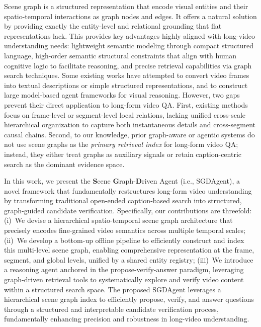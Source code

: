 \documentclass[sigconf, screen, review, anonymous]{acmart}
\begin{document}
Scene graph is a structured representation that encode visual entities and their spatio-temporal interactions as graph nodes and edges\cite{scenegraph1,tpt2023}. It offers a natural solution by providing exactly the entity-level and relational grounding that flat representations lack. This provides key advantages highly aligned with long-video understanding needs: lightweight semantic modeling through compact structured language, high-order semantic structural constraints that align with human cognitive logic to facilitate reasoning, and precise retrieval capabilities via graph search techniques\cite{scenegraph1,scenegraph2,qiu2025step}. 
Some existing works\cite{fei2024videoofthought, videoagent, omagent2024, vagent2025, deepvideo2025, drvideo2025} have attempted to convert video frames into textual descriptions or simple structured representations, and to construct large model-based agent frameworks for visual reasoning.
However, two gaps prevent their direct application to long-form video QA\@. First, existing methods focus on frame-level or segment-level local relations, lacking unified cross-scale hierarchical organization to capture both instantaneous details and cross-segment causal chains\cite{tpt2023,vagent2025}. Second, to our knowledge, prior graph-aware or agentic systems do not use scene graphs as the \emph{primary retrieval index} for long-form video QA; instead, they either treat graphs as auxiliary signals or retain caption-centric search as the dominant evidence space\cite{vagent2025,videoagent,deepvideo2025}.


In this work, we present the \textbf{S}cene \textbf{G}raph-\textbf{D}riven Agent (i.e., SGDAgent), a novel framework that fundamentally restructures long-form video understanding by transforming traditional open-ended caption-based search into structured, graph-guided candidate verification. Specifically, our contributions are threefold: (i)~We devise a hierarchical spatio-temporal scene graph architecture that precisely encodes fine-grained video semantics across multiple temporal scales; (ii)~We develop a bottom-up offline pipeline to efficiently construct and index this multi-level scene graph, enabling comprehensive representation at the frame, segment, and global levels, unified by a shared entity registry; (iii)~We introduce a reasoning agent anchored in the propose-verify-answer paradigm, leveraging graph-driven retrieval tools to systematically explore and verify video content within a structured search space.
The proposed SGDAgent leverages a hierarchical scene graph index to efficiently propose, verify, and answer questions through a structured and interpretable candidate verification process, fundamentally enhancing precision and robustness in long-video understanding. 
\end{document}
